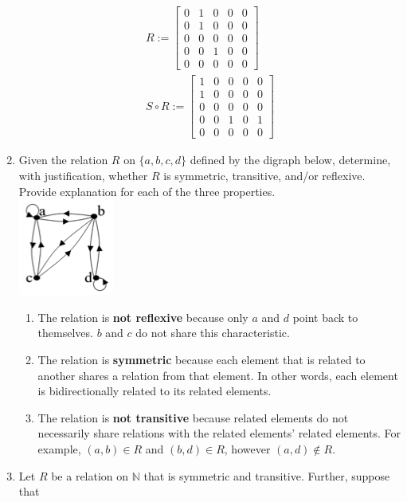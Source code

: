 \documentclass[letterpaper, 12pt]{article}
\newcommand{\N}{\mathbb{N}}
\newcommand{\0}{\emptyset}
\begin{document}
\begin{enumerate}
\begin{gather*}
    R := \begin{bmatrix}
        0 & 1 & 0 & 0 & 0 \\
        0 & 1 & 0 & 0 & 0 \\
        0 & 0 & 0 & 0 & 0 \\
        0 & 0 & 1 & 0 & 0 \\
        0 & 0 & 0 & 0 & 0
    \end{bmatrix} \\
    S \circ R := \begin{bmatrix}
        1 & 0 & 0 & 0 & 0 \\
        1 & 0 & 0 & 0 & 0 \\
        0 & 0 & 0 & 0 & 0 \\
        0 & 0 & 1 & 0 & 1 \\
        0 & 0 & 0 & 0 & 0
    \end{bmatrix}
\end{gather*}
\item Given the relation $R$ on $\{a,b,c,d\}$ defined by the digraph below, determine, with 
justification, whether $R$ is symmetric, transitive, and/or reflexive. Provide explanation for 
each of the three properties. \\
\includegraphics{digraph}
\begin{enumerate}
    \item The relation is \textbf{not reflexive} because only $a$ and $d$ point back to 
    themselves. $b$ and $c$ do not share this characteristic.
    \item The relation is \textbf{symmetric} because each element that is related to another 
    shares a relation from that element. In other words, each element is bidirectionally related 
    to its related elements.
    \item The relation is \textbf{not transitive} because related elements do not necessarily 
    share relations with the related elements' related elements. For example, $(a,b) \in R$ and 
    $(b, d) \in R$, however $(a, d) \notin R$.
\end{enumerate}
\pagebreak
\item Let $R$ be a relation on $\N$ that is symmetric and transitive. Further, suppose that 

\end{enumerate}
\end{document}

